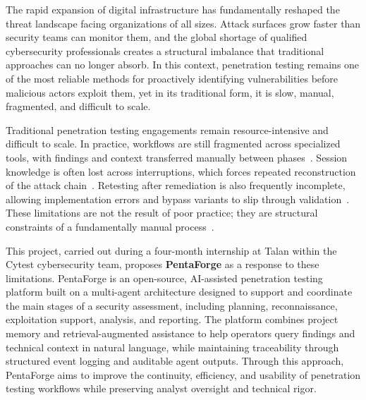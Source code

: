 \documentclass[12pt,a4paper]{report}
\begin{document}
The rapid expansion of digital infrastructure has fundamentally reshaped the threat
landscape facing organizations of all sizes. Attack surfaces grow faster than security
teams can monitor them, and the global shortage of qualified cybersecurity professionals
creates a structural imbalance that traditional approaches can no longer absorb. In this
context, penetration testing remains one of the most reliable methods for proactively
identifying vulnerabilities before malicious actors exploit them, yet in its traditional
form, it is slow, manual, fragmented, and difficult to scale.

\vspace{0.8cm}

Traditional penetration testing engagements remain resource-intensive and difficult to scale. In practice, workflows are still fragmented across specialized tools, with findings and context transferred manually between phases~\cite{autosecagent2026,emazzantiTools}. Session knowledge is often lost across interruptions, which forces repeated reconstruction of the attack chain~\cite{pentestgpt2023}. Retesting after remediation is also frequently incomplete, allowing implementation errors and bypass variants to slip through validation~\cite{hedgehogRetesting,redleggRetesting,halockVerification}. These limitations are not the result of poor practice; they are structural constraints of a fundamentally manual process~\cite{cycognitoPentest}.

\vspace{0.8cm}

This project, carried out during a four-month internship at Talan within the Cytest
cybersecurity team, proposes \textbf{PentaForge} as a response to these limitations.
PentaForge is an open-source, AI-assisted penetration testing platform built on a
multi-agent architecture designed to support and coordinate the main stages of a security
assessment, including planning, reconnaissance, exploitation support, analysis, and
reporting. The platform combines project memory and retrieval-augmented assistance to
help operators query findings and technical context in natural language, while
maintaining traceability through structured event logging and auditable agent outputs.
Through this approach, PentaForge aims to improve the continuity, efficiency, and
usability of penetration testing workflows while preserving analyst oversight and
technical rigor.

\vspace{0.8cm}
\end{document}
